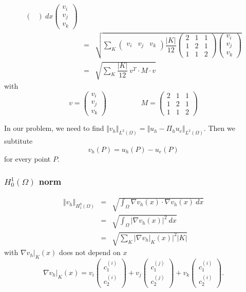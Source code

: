 \documentclass[a4paper,10pt]{article}
\begin{document}
\begin{eqnarray}
{\begin{pmatrix}
	\end{pmatrix}
	\ dx
	\begin{pmatrix}
	v_{i} \\ v_{j} \\ v_{k}
	\end{pmatrix}} \\ \nonumber
&=& \sqrt{ \sum_{K}
	\begin{pmatrix}
	v_{i} & v_{j} & v_{k}
	\end{pmatrix}
	\dfrac{\vert K \vert}{12}
	\begin{pmatrix}
	2 & 1 & 1 \\ 1 & 2 & 1 \\ 1 & 1 & 2
	\end{pmatrix}
	\begin{pmatrix}
	v_{i} \\ v_{j} \\ v_{k}
	\end{pmatrix}} \\ \nonumber
&=& \sqrt{ \sum_{K}
	\dfrac{\vert K \vert}{12} \ v^{T} \cdot M \cdot v
	}
\end{eqnarray}
with
\[ v = \begin{pmatrix}
v_{i} \\ v_{j} \\ v_{k}
\end{pmatrix} \hspace{2cm}
M = \begin{pmatrix}
2 & 1 & 1 \\ 1 & 2 & 1 \\ 1 & 1 & 2
\end{pmatrix}  \]

In our problem, we need to find $ \Vert v_{h} \Vert_{L^2(\Omega)} = \Vert u_{h} - \Pi_{h}u_{e} \Vert_{L^2(\Omega)} $. Then we subtitute
\[ v_{h}(P) = u_{h}(P) - u_{e}(P) \]
for every point $ P $.

\subsubsection{$ H_{0}^{1}(\Omega) $ norm}
\begin{eqnarray} \nonumber
\Vert v_{h} \Vert_{H_1^0(\Omega)} &=& \sqrt{\int_{\Omega} \nabla v_{h}(x) \cdot \nabla v_{h}(x) \ dx} \\ \nonumber
&=& \sqrt{\int_{\Omega} \vert \nabla v_{h}(x) \vert^{2} \ dx} \\ \nonumber
&=& \sqrt{\sum_{K} \vert \nabla v_{h}|_{K} (x) \vert^{2} \vert K \vert}
\end{eqnarray}
with $ \nabla v_{h}|_{K}(x) $ does not depend on $ x $
\[ \nabla v_{h}|_{K}(x) = v_{i} \begin{pmatrix} c_{1}^{(i)}\\ c_{2}^{(i)} \end{pmatrix} + v_{j} \begin{pmatrix} c_{1}^{(j)}\\ c_{2}^{(j)} \end{pmatrix} + v_{k} \begin{pmatrix} c_{1}^{(i)}\\ c_{2}^{(i)} \end{pmatrix}.\] 
\end{document}
